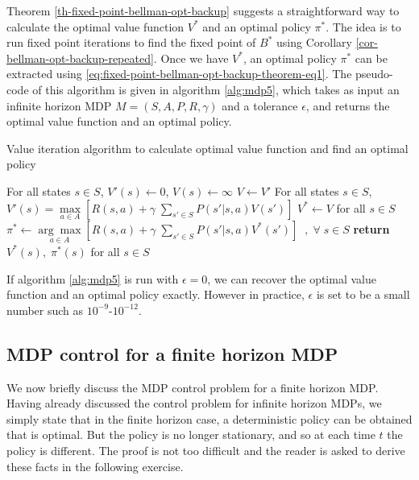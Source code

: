 \documentclass{article}
\theoremstyle{definition}
\theoremstyle{remark}
\begin{document}
Theorem \ref{th-fixed-point-bellman-opt-backup} suggests a straightforward way to calculate the optimal value function $V^{\ast}$ and an optimal policy $\pi^{\ast}$. The idea is to run fixed point iterations to find the fixed point of $B^{\ast}$ using Corollary \ref{cor-bellman-opt-backup-repeated}. Once we have $V^{\ast}$, an optimal policy $\pi^{\ast}$ can be extracted using \eqref{eq:fixed-point-bellman-opt-backup-theorem-eq1}. The pseudo-code of this algorithm is given in algorithm \ref{alg:mdp5}, which takes as input an infinite horizon MDP $M = (S,A,P,R,\gamma)$ and a tolerance $\epsilon$, and returns the optimal value function and an optimal policy.

\begin{algorithm}
\caption{Value iteration algorithm to calculate optimal value function and find an optimal policy}\label{alg:mdp5}
\begin{algorithmic}[1]
\State For all states $s \in S$, $V'(s)\gets 0$, $V(s) \gets \infty$
\State $V \gets V'$
\State For all states $s \in S$, $V'(s) = \underset{a \in A}{\max} \left[ R(s,a) + \gamma \; \sum_{s' \in S} P(s'|s,a) V(s') \right]$
\EndWhile\label{mdp5label}
\State $V^{\ast} \gets V$ for all $s \in S$
\State $\pi^{\ast} \gets \underset{a \in A}{\arg\max} \left[ R(s,a) + \gamma \; \sum_{s' \in S} P(s'|s,a) V^{\ast}(s') \right]  \;\;,\; \forall \; s \in S$
\State \textbf{return} $V^{\ast}(s), \; \pi^{\ast}(s)$ for all $s \in S$
\EndProcedure
\end{algorithmic}
\end{algorithm}

If algorithm \ref{alg:mdp5} is run with $\epsilon = 0$, we can recover the optimal value function and an optimal policy exactly. However in practice, $\epsilon$ is set to be a small number such as $10^{-9}$-$10^{-12}$.

\subsection{MDP control for a finite horizon MDP}
We now briefly discuss the MDP control problem for a finite horizon MDP. Having already discussed the control problem for infinite horizon MDPs, we simply state that in the finite horizon case, a deterministic policy can be obtained that is optimal. But the policy is no longer stationary, and so at each time $t$ the policy is different. The proof is not too difficult and the reader is asked to derive these facts in the following exercise.
\end{document}
